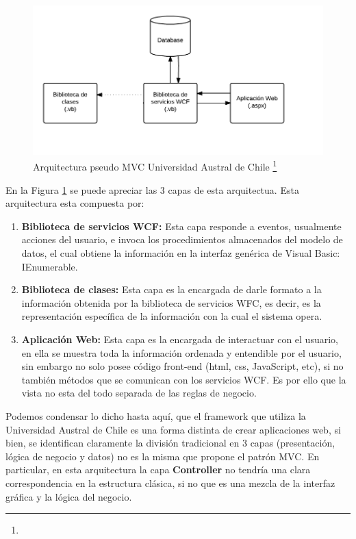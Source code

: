 	\begin{figure}[H]
		\centering
		\includegraphics[width=1\textwidth]{images/Capitulo_2/pseudoMVC.png}
		\caption[Arquitectura pseudo MVC Universidad Austral de Chile]{Arquitectura pseudo MVC Universidad Austral de Chile \footnote{}}
		\label{FiguraMVC}
	\end{figure}
	
En la Figura \ref{FiguraMVC} se puede apreciar las 3 capas de esta arquitectua. Esta arquitectura esta compuesta por:
\begin{enumerate}
	\item \textbf{Biblioteca de servicios WCF:} Esta capa responde a eventos, usualmente acciones del usuario, e invoca los procedimientos almacenados del modelo de datos, el cual obtiene la información en la interfaz genérica de Visual Basic: IEnumerable.
	
	\item \textbf{Biblioteca de clases:} Esta capa es la encargada de darle formato a la información obtenida por la biblioteca de servicios WFC, es decir, es la representación específica de la información con la cual el sistema opera.
	
	\item \textbf{Aplicación Web:} Esta capa es la encargada de interactuar con el usuario, en ella se muestra toda la información ordenada y entendible por el usuario, sin embargo no solo posee código front-end (html, css, JavaScript, etc), si no también métodos que se comunican con los servicios WCF. Es por ello que la vista  no esta del todo separada de las reglas de negocio.
\end{enumerate}


Podemos condensar lo dicho hasta aquí, que el framework que utiliza la Universidad Austral de Chile es una forma distinta de crear aplicaciones web, si bien, se identifican claramente  la división tradicional en 3 capas (presentación, lógica de negocio y datos) no es la misma que propone el patrón MVC. En particular, en esta arquitectura  la capa \textbf{Controller} no tendría una clara correspondencia en la estructura clásica, si no que es  una mezcla de la interfaz gráfica y la lógica del negocio.

